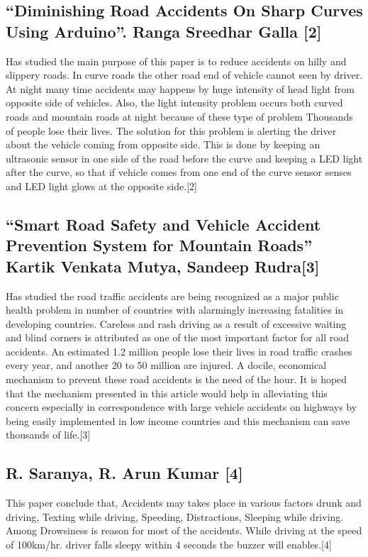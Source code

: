 \documentclass[conference]{IEEEtran}
\begin{document}
    \subsection{“Diminishing Road Accidents On Sharp Curves Using Arduino”. Ranga Sreedhar Galla [2]}
    Has studied the main purpose of this paper is to reduce accidents on hilly and slippery roads. In curve roads the other road end of
    vehicle cannot seen by driver. At night many time accidents may happens by huge intensity of head light from opposite side of
    vehicles. Also, the light intensity problem occurs both curved roads and mountain roads at night because of these type of problem
    Thousands of people lose their lives. The solution for this problem is alerting the driver about the vehicle coming from opposite
    side. This is done by keeping an ultrasonic sensor in one side of the road before the curve and keeping a LED light after the curve,
    so that if vehicle comes from one end of the curve sensor senses and LED light glows at the opposite side.[2]
    
    \subsection{“Smart Road Safety and Vehicle Accident Prevention System for Mountain Roads” Kartik Venkata Mutya, Sandeep Rudra[3]}
    Has studied the road traffic accidents are being recognized as a major public health problem in number of countries with alarmingly
    increasing fatalities in developing countries. Careless and rash driving as a result of excessive waiting and blind corners is attributed
    as one of the most important factor for all road accidents. An estimated 1.2 million people lose their lives in road traffic crashes
    every year, and another 20 to 50 million are injured. A docile, economical mechanism to prevent these road accidents is the need of
    the hour. It is hoped that the mechanism presented in this article would help in alleviating this concern especially in correspondence
    with large vehicle accidents on highways by being easily implemented in low income countries and this mechanism can save
    thousands of life.[3]
    
    \subsection{R. Saranya, R. Arun Kumar [4]}
    This paper conclude that, Accidents may takes place in various factors drunk and driving, Texting while driving, Speeding,
    Distractions, Sleeping while driving. Among Drowsiness is reason for most of the accidents. While driving at the speed of
    100km/hr. driver falls sleepy within 4 seconds the buzzer will enables.[4]
    
\end{document}
